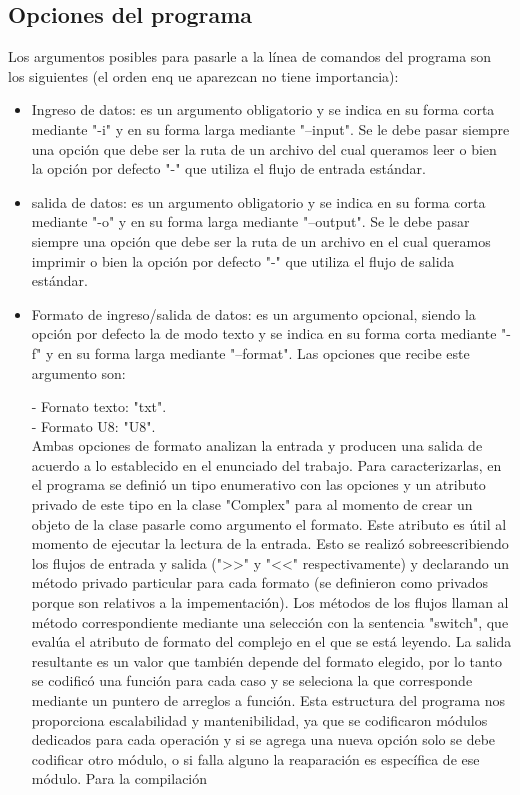 \documentclass[10pt,a4paper]{article}
\begin{document}
\subsection{Opciones del programa}
Los argumentos posibles para pasarle a la línea de comandos del programa son los siguientes (el orden enq ue aparezcan no tiene importancia):
\begin{itemize}
\item  Ingreso de datos: es un argumento obligatorio y se indica en su forma corta mediante "-i" y en su forma larga mediante "--input". Se le debe pasar siempre una opción que debe ser la ruta de un archivo del cual queramos leer o bien la opción por defecto "-" que utiliza el flujo de entrada estándar.

\item  salida de datos: es un argumento obligatorio y se indica en su forma corta mediante "-o" y en su forma larga mediante "--output". Se le debe pasar siempre una opción que debe ser la ruta de un archivo en el cual queramos imprimir o bien la opción por defecto "-" que utiliza el flujo de salida estándar.

\item  Formato de ingreso/salida de datos: es un argumento opcional, siendo la opción por defecto la de modo texto y se indica en su forma corta mediante "-f" y en su forma larga mediante "--format". Las opciones que recibe este argumento son:

	- Fornato texto: "txt".\\
	- Formato U8: "U8".\\

Ambas opciones de formato analizan la entrada y producen una salida de acuerdo a lo establecido en el enunciado del trabajo. Para caracterizarlas, en el programa se definió un tipo enumerativo con las opciones y un atributo privado de este tipo en la clase "Complex" para al momento de crear un objeto de la clase pasarle como argumento el formato. Este atributo es útil al momento de ejecutar la lectura de la entrada. Esto se realizó sobreescribiendo los flujos de entrada y salida (">>" y "<<" respectivamente) y declarando un método privado particular para cada formato (se definieron como privados porque son relativos a la impementación). Los métodos de los flujos llaman al método correspondiente mediante una selección con la sentencia "switch", que evalúa el atributo de formato del complejo en el que se está leyendo.
La salida resultante es un valor que también depende del formato elegido, por lo tanto se codificó una función para cada caso  y se seleciona la que corresponde mediante un puntero de arreglos a función.
Esta estructura del programa nos proporciona escalabilidad y mantenibilidad, ya que se codificaron módulos dedicados para cada operación y si se agrega una nueva opción solo se debe codificar otro módulo, o si falla alguno la reaparación es específica de ese módulo.
Para la compilación

\end{itemize}
\end{document}
